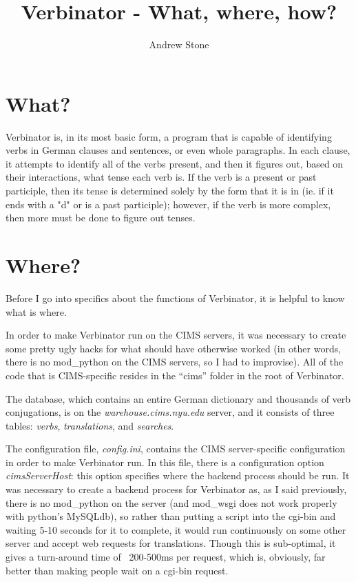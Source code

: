 \documentclass[12pt]{article}
\begin{document}
\title{Verbinator - What, where, how?}
\author{Andrew Stone}
\renewcommand{\today}{21 December 2010}
\maketitle

\section{What?}

Verbinator is, in its most basic form, a program that is capable of identifying verbs in German
clauses and sentences, or even whole paragraphs. In each clause, it attempts to identify all of the
verbs present, and then it figures out, based on their interactions, what tense each verb is. If the
verb is a present or past participle, then its tense is determined solely by the form that it is in
(ie. if it ends with a "d" or is a past participle); however, if the verb is more complex, then more
must be done to figure out tenses.

\section{Where?}

Before I go into specifics about the functions of Verbinator, it is helpful to know what is where.

In order to make Verbinator run on the CIMS servers, it was necessary to create some pretty ugly
hacks for what should have otherwise worked (in other words, there is no mod\_python on the CIMS
servers, so I had to improvise). All of the code that is CIMS-specific resides in the ``cims'' folder
in the root of Verbinator.

The database, which contains an entire German dictionary and thousands of verb conjugations, is on the
\emph{warehouse.cims.nyu.edu} server, and it consists of three tables: \emph{verbs}, \emph{translations},
and \emph{searches}.

The configuration file, \emph{config.ini}, contains the CIMS server-specific configuration in order
to make Verbinator run. In this file, there is a configuration option \emph{cimsServerHost}: this option
specifies where the backend process should be run. It was necessary to create a backend process for
Verbinator as, as I said previously, there is no mod\_python on the server (and mod\_wsgi does not
work properly with python's MySQLdb), so rather than putting a script into the cgi-bin and waiting
5-10 seconds for it to complete, it would run continuously on some other server and accept web requests
for translations.  Though this is sub-optimal, it gives a turn-around time of ~200-500ms per request,
which is, obviously, far better than making people wait on a cgi-bin request.
\end{document}
